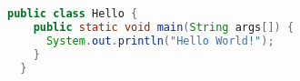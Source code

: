 \begin{lstlisting}[gobble=2,language=Java]
  public class Hello {
    public static void main(String args[]) {
      System.out.println("Hello World!");
    }
  }
\end{lstlisting}